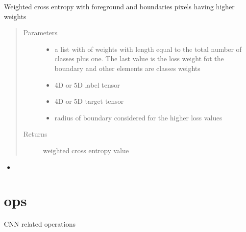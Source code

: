 \documentclass[letterpaper,10pt,english]{sphinxmanual}
\begin{document}
\begin{fulllineitems}
\label{\detokenize{index:unet.loss.weighted_cross_entropy_with_boundary}}
Weighted cross entropy with foreground and boundaries pixels having  higher weights
\begin{quote}\begin{description}
\item[{Parameters}] \leavevmode\begin{itemize}
\item {} 
 \textendash{} a list with of weights with length equal to the total number of classes plus one. The last
value is the loss weight fot the boundary and other elements are classes weights

\item {} 
 \textendash{} 4D or 5D label tensor

\item {} 
 \textendash{} 4D or 5D target tensor

\item {} 
 \textendash{} radius of boundary considered for the higher loss values

\end{itemize}

\item[{Returns}] \leavevmode
weighted cross entropy value

\end{description}\end{quote}



\begin{itemize}
\item {} 
{\hyperref[\detokenize{index:unet.loss.mask_boundary_neighborhood}]{}}

\end{itemize}



\end{fulllineitems}



\section{ops}
\label{\detokenize{index:module-unet.ops}}\label{\detokenize{index:ops}}
CNN related operations
\end{document}
